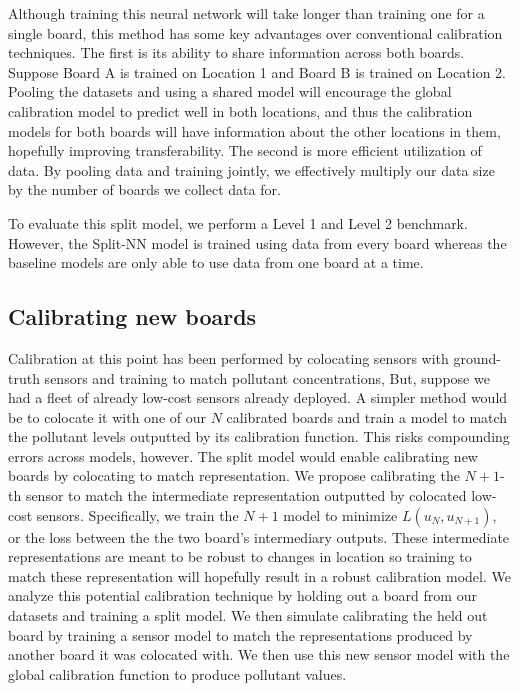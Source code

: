 \documentclass[journal abbreviation, manuscript]{copernicus}
\begin{document}
Although training this neural network will take longer than training one for a single board, this method has some key advantages over conventional calibration techniques. 
The first is its ability to share information across both boards. 
Suppose Board A is trained on Location 1 and Board B is trained on Location 2. Pooling the datasets and using a shared model will encourage the global calibration model to predict well in both locations, and thus the calibration models for both boards will have information about the other locations in them, hopefully improving transferability.
The second is more efficient utilization of data. By pooling data and training jointly, we effectively multiply our data size by the number of boards we collect data for.

To evaluate this split model, we perform a Level 1 and Level 2 benchmark.
However, the Split-NN model is trained using data from every board whereas
the baseline models are only able to use data from one board at a time.


\subsection{Calibrating new boards}
Calibration at this point has been performed by colocating sensors with ground-truth sensors and training to match pollutant concentrations,
But, suppose we had a fleet of already low-cost sensors already deployed. 
A simpler method would be to colocate it with one of our $N$ calibrated boards and train a model to match the pollutant levels outputted by its calibration function. This risks compounding errors across models, however. 
The split model would enable calibrating new boards by colocating to match representation.
We propose calibrating the $N+1$-th sensor to match the intermediate representation outputted by colocated low-cost sensors. Specifically,
we train the $N + 1$ model to minimize $L(u_N, u_{N + 1})$, or
the loss between the the two board's intermediary outputs.
These intermediate representations are meant to be robust to changes in location so training to match these representation will hopefully result in a robust calibration model. We analyze this potential calibration technique by holding out a board from our datasets and training a split model. We then simulate calibrating the held out board by training a sensor model to match the representations produced by another board it was colocated with. We then use this new sensor model with the global calibration function to produce pollutant values. 
\end{document}
